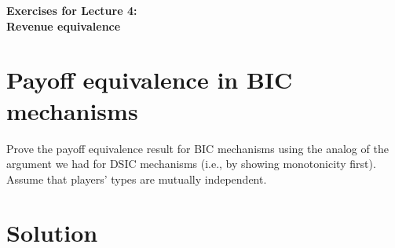 \documentclass[a4paper]{article}
\newif\ifsolutions
\begin{document}
\begin{center}
		\LARGE\textbf{Exercises for Lecture 4:\\ Revenue equivalence}
\end{center}



\section{Payoff equivalence in BIC mechanisms}

	Prove the payoff equivalence result for BIC mechanisms using the analog of the argument we had for DSIC mechanisms (i.e., by showing monotonicity first). Assume that players' types are mutually independent.
	
\ifsolutions
\section*{Solution}
\end{document}
